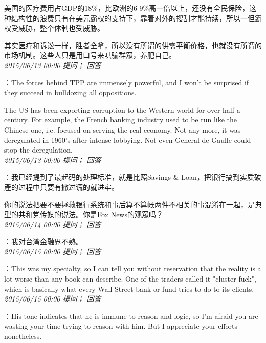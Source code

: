 \documentclass[twocolumn]{ctexart}
\begin{document}
美国的医疗费用占GDP的18\%，比欧洲的6-9\%高一倍以上，还没有全民保险，这种结构性的浪费只有在美元霸权的支持下，靠着对外的搜刮才能持续，所以一但霸权受威胁，整个体制也受威胁。

其实医疗和诉讼一样，胜者全拿，所以没有所谓的供需平衡价格，也就没有所谓的市场机制。这些人只是用口号来哄骗群眾，养肥自己。\\

\textit{\hfill\noindent\small 2015/06/13 00:00 提问； 回答}

：The forces behind TPP are immensely powerful, and I won't be surprised if they succeed in bulldozing all oppositions.

The US has been exporting corruption to the Western world for over half a century. For example, the French banking industry used to be run like the Chinese one, i.e. focused on serving the real economy. Not any more, it was deregulated in 1960's after intense lobbying. Not even General de Gaulle could stop the deregulation.\\

\textit{\hfill\noindent\small 2015/06/13 00:00 提问； 回答}

：我已经提到了最起码的处理标准，就是比照Savings \& Loan，把银行搞到实质破產的过程中只要有撒过谎的就进牢。

你的说法把要不要拯救银行系统和事后算不算帐两件不相关的事混淆在一起，是典型的共和党传媒的说法。你是Fox News的观眾吗？\\

\textit{\hfill\noindent\small 2015/06/14 00:00 提问； 回答}

：我对台湾金融界不熟。\\

\textit{\hfill\noindent\small 2015/06/15 00:00 提问； 回答}

：This was my specialty, so I can tell you without reservation that the reality is a lot worse than any book can describe. One of the traders called it "cluster-fuck", which is basically what every Wall Street bank or fund tries to do to its clients.\\

\textit{\hfill\noindent\small 2015/06/15 00:00 提问； 回答}

：His tone indicates that he is immune to reason and logic, so I'm afraid you are wasting your time trying to reason with him. But I appreciate your efforts nonetheless.\\
\end{document}

